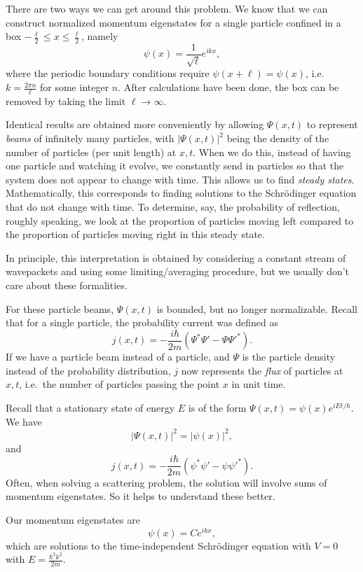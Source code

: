 \documentclass[a4paper]{article}
\begin{document}
There are two ways we can get around this problem. We know that we can construct normalized momentum eigenstates for a single particle confined in a box $-\frac{\ell}{2} \leq x \leq \frac{\ell}{2}$, namely
\[
  \psi(x) = \frac{1}{\sqrt{\ell}} e^{ikx},
\]
where the periodic boundary conditions require $\psi(x + \ell) = \psi(x)$, i.e.\ $k = \frac{2\pi n}{\ell}$ for some integer $n$. After calculations have been done, the box can be removed by taking the limit $\ell \to \infty$.

Identical results are obtained more conveniently by allowing $\Psi(x, t)$ to represent \emph{beams} of infinitely many particles, with $|\Psi(x, t)|^2$ being the density of the number of particles (per unit length) at $x, t$. When we do this, instead of having one particle and watching it evolve, we constantly send in particles so that the system does not appear to change with time. This allows us to find \emph{steady states}. Mathematically, this corresponds to finding solutions to the Schr\"odinger equation that do not change with time. To determine, say, the probability of reflection, roughly speaking, we look at the proportion of particles moving left compared to the proportion of particles moving right in this steady state.

In principle, this interpretation is obtained by considering a constant stream of wavepackets and using some limiting/averaging procedure, but we usually don't care about these formalities.

For these particle beams, $\Psi(x, t)$ is bounded, but no longer normalizable. Recall that for a single particle, the probability current was defined as
\[
  j(x, t) = -\frac{i\hbar}{2m}(\Psi^* \Psi' - \Psi \Psi'^*).
\]
If we have a particle beam instead of a particle, and $\Psi$ is the particle density instead of the probability distribution, $j$ now represents the \emph{flux} of particles at $x, t$, i.e.\ the number of particles passing the point $x$ in unit time.

Recall that a stationary state of energy $E$ is of the form $\Psi(x, t) = \psi(x) e^{iEt/\hbar}$. We have
\[
  |\Psi(x, t)|^2 = |\psi(x)|^2,
\]
and
\[
  j(x, t) = -\frac{i\hbar}{2m}(\psi^* \psi' - \psi\psi'^*).
\]
Often, when solving a scattering problem, the solution will involve sums of momentum eigenstates. So it helps to understand these better.

Our momentum eigenstates are
\[
  \psi(x) = Ce^{ikx},
\]
which are solutions to the time-independent Schr\"odinger equation with $V = 0$ with $E = \frac{\hbar^2 k^2}{2m}$.
\end{document}
